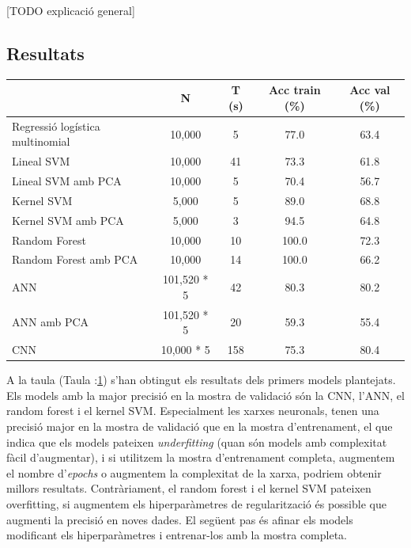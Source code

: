 \documentclass[12pt, spanish]{article}
\begin{document}
[TODO explicació general]










\subsection{Resultats}

\begin{table}[hbt!]
\centering
\begin{tabular}{lcccc}  
\toprule
                                              & N         & T (s)  & Acc train (\%) & Acc val (\%) \\  
\midrule
Regressió logística multinomial  & 10,000 & 5   & 77.0        & 63.4 \\
Lineal SVM                              & 10,000 & 41  & 73.3       & 61.8  \\
Lineal SVM amb PCA                & 10,000 & 5    & 70.4       & 56.7  \\
Kernel SVM                             & 5,000   & 5    & 89.0       & 68.8  \\
Kernel SVM amb PCA               & 5,000   & 3    & 94.5       & 64.8  \\
Random Forest                        & 10,000 & 10  & 100.0     & 72.3 \\
Random Forest amb PCA          & 10,000 & 14  & 100.0     & 66.2  \\
ANN 				      & 101,520 * 5 & 42 & 80.3 & 80.2  \\
ANN amb PCA                         & 101,520 * 5 & 20 & 59.3 & 55.4 \\
CNN					     & 10,000 * 5   & 158 & 75.3 & 80.4 \\
\bottomrule
\end{tabular}
\label{tab:taula2}
\end{table}

A la taula (Taula :\ref{tab:taula2}) s'han obtingut els resultats dels primers models plantejats. Els models amb la major precisió en la mostra de validació són la CNN, l'ANN, el random forest i el kernel SVM. Especialment les xarxes neuronals, tenen una precisió major en la mostra de validació que en la mostra d'entrenament, el que indica que els models pateixen \textit{underfitting} (quan són models amb complexitat fàcil d'augmentar), i si utilitzem la mostra d'entrenament completa, augmentem el nombre d'\textit{epochs} o augmentem la complexitat de la xarxa, podriem obtenir millors resultats. Contràriament, el random forest i el kernel SVM pateixen overfitting, si augmentem els hiperparàmetres de regularització és possible que augmenti la precisió en noves dades. El següent pas és afinar els models modificant els hiperparàmetres i entrenar-los amb la mostra completa.
\end{document}
